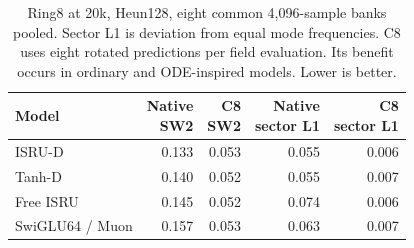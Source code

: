 \begin{table}[H]
\centering\small
\begin{tabular}{@{}lrrrr@{}}
\toprule
Model & \shortstack{Native\\SW2} & \shortstack{C8\\SW2} & \shortstack{Native\\sector L1} & \shortstack{C8\\sector L1}\\
\midrule
ISRU-D & 0.133 & 0.053 & 0.055 & 0.006\\
Tanh-D & 0.140 & 0.052 & 0.055 & 0.007\\
Free ISRU & 0.145 & 0.052 & 0.074 & 0.006\\
SwiGLU64 / Muon & 0.157 & 0.053 & 0.063 & 0.007\\
\bottomrule
\end{tabular}
\caption{Ring8 at 20k, Heun128, eight common 4,096-sample banks pooled. Sector L1 is deviation from equal mode frequencies. C8 uses eight rotated predictions per field evaluation. Its benefit occurs in ordinary and ODE-inspired models. Lower is better.}
\label{tab:symmetry}
\end{table}
